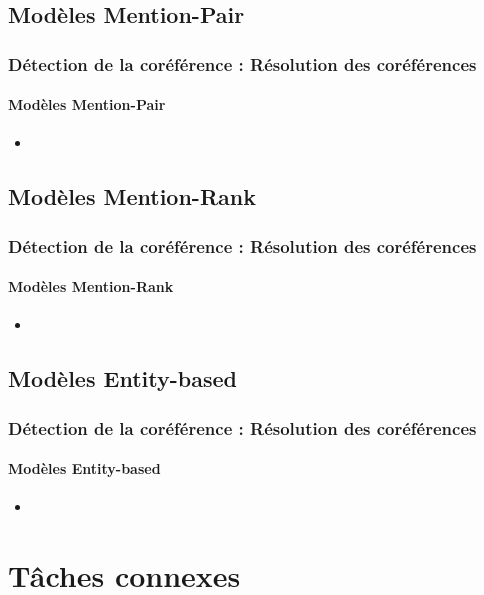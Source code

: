 \documentclass[xcolor=table]{beamer}
\begin{document}
\subsection{Modèles Mention-Pair}

\begin{frame}
	\frametitle{Détection de la coréférence : Résolution des coréférences}
	\framesubtitle{Modèles Mention-Pair}
	
	\begin{itemize}
		\item 
	\end{itemize}
	
\end{frame}

\subsection{Modèles Mention-Rank}

\begin{frame}
	\frametitle{Détection de la coréférence : Résolution des coréférences}
	\framesubtitle{Modèles Mention-Rank}
	
	\begin{itemize}
		\item 
	\end{itemize}
	
\end{frame}

\subsection{Modèles Entity-based}

\begin{frame}
	\frametitle{Détection de la coréférence : Résolution des coréférences}
	\framesubtitle{Modèles Entity-based}
	
	\begin{itemize}
		\item 
	\end{itemize}
	
\end{frame}

\section{Tâches connexes}
\end{document}
